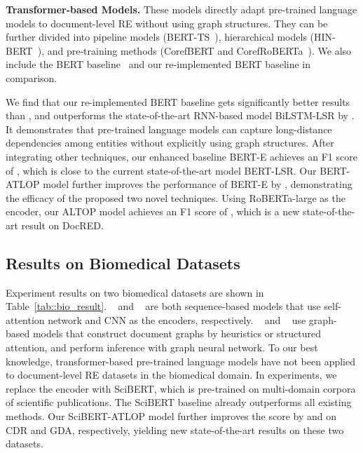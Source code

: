 \documentclass[letterpaper]{article}
\begin{document}
\smallskip
\noindent
\textbf{Transformer-based Models.}
These models directly adapt pre-trained language models to document-level RE without using graph structures.
They can be further divided into pipeline models (BERT-TS~\cite{Wang2019FinetuneBF}), hierarchical models (HIN-BERT~\cite{Tang2020HINHI}), and pre-training methods (CorefBERT and CorefRoBERTa~\cite{Ye2020CoreferentialRL}).
We also include the BERT baseline~\cite{Wang2019FinetuneBF} and our re-implemented BERT baseline in comparison.

We find that our re-implemented BERT baseline gets significantly better results than \citet{Wang2019FinetuneBF}, and outperforms the state-of-the-art RNN-based model BiLSTM-LSR by .
It demonstrates that pre-trained language models can capture long-distance dependencies among entities without explicitly using graph structures.
After integrating other techniques, our enhanced baseline BERT-E achieves an F1 score of , which is close to the current state-of-the-art model BERT-LSR.
Our BERT-ATLOP model further improves the performance of BERT-E by , demonstrating the efficacy of the proposed two novel techniques.
Using RoBERTa-large as the encoder, our ALTOP model achieves an F1 score of , which is a new state-of-the-art result on DocRED.

\subsection{Results on Biomedical Datasets}
Experiment results on two biomedical datasets are shown in Table~\ref{tab::bio_result}.
~\citet{Verga2018SimultaneouslyST} and ~\citet{Nguyen2018ConvolutionalNN} are both sequence-based models that use self-attention network and CNN as the encoders, respectively.
~\citet{Christopoulou2019ConnectingTD} and ~\citet{Nan2020ReasoningWL} use graph-based models that construct document graphs by heuristics or structured attention, and perform inference with graph neural network.
To our best knowledge, transformer-based pre-trained language models have not been applied to document-level RE datasets in the biomedical domain.
In experiments, we replace the encoder with SciBERT, which is pre-trained on multi-domain corpora of scientific publications.
The SciBERT baseline already outperforms all existing methods.
Our SciBERT-ATLOP model further improves the  score by  and  on CDR and GDA, respectively, yielding new state-of-the-art results on these two datasets.
\end{document}
